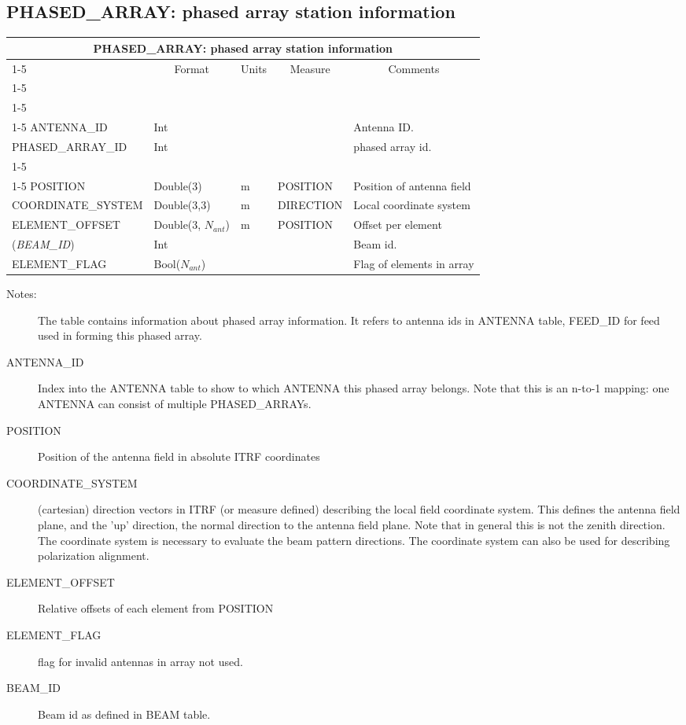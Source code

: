 \documentclass{article}
\newcommand{\na}{$N_{ant}$}
\newcommand{\defline}[1]{\cline{1-5}
\multicolumn{5}{|l|}{#1} \\
\cline{1-5}}
\newcommand{\definetable}[2]
{
	\vfill\newpage
	\subsection{#1}
        \vspace{0.15in}
        \small
	\begin{tabular}{|l|p{1.25in}|l|p{.9in}|p{1.4in}|}
	\hline
	\multicolumn{5}{|c|}{\bf #1}\\ 
	\cline{1-5}
        \multicolumn{1}{|c|}{Name}&\multicolumn{1}{|c|}{Format}&
        \multicolumn{1}{|c|}{Units}&\multicolumn{1}{|c|}{Measure}&
        \multicolumn{1}{|c|}{Comments}\\
        \cline{1-5}
        #2
        \hline
	\end{tabular}
}
\begin{document}
\definetable{PHASED\_ARRAY: phased array station information}{
\defline{\bf Columns}
\defline{\em Key}
ANTENNA\_ID & Int & & & Antenna ID. \\
PHASED\_ARRAY\_ID & Int & & & phased array id.\\
\defline{\em Data}
POSITION & Double(3) & m & POSITION & Position of antenna field \\
COORDINATE\_SYSTEM & Double(3,3) & m & DIRECTION & Local coordinate system \\
ELEMENT\_OFFSET & Double(3, \na) & m & POSITION & Offset per element \\
({\it BEAM\_ID}) & Int &  &  & Beam id.\\
ELEMENT\_FLAG & Bool(\na) &  & & Flag of elements in array\\
}
\begin{description}

\item[Notes:] The table contains information about phased array information. It refers to antenna ids in ANTENNA table, FEED\_ID for feed  used in forming this phased array.  

\item[ANTENNA\_ID] Index into the ANTENNA table to show to which ANTENNA this phased array belongs. Note that this is an n-to-1 mapping: one ANTENNA can consist of multiple PHASED\_ARRAYs.

\item[POSITION] Position of the antenna field in absolute ITRF coordinates

\item[COORDINATE\_SYSTEM] (cartesian) direction vectors in ITRF (or measure defined) describing the
local field coordinate system. This defines the antenna field plane, and the 'up' direction, the normal direction to the antenna field plane. Note that in general this is not the zenith direction. The coordinate system is necessary to evaluate the beam pattern directions. The coordinate system can also be used for describing polarization alignment.  

\item[ELEMENT\_OFFSET] Relative offsets of each element from POSITION

\item[ELEMENT\_FLAG] flag for invalid antennas in array not used.

\item[BEAM\_ID] Beam id as defined in BEAM table. 


\end{description}
\end{document}
